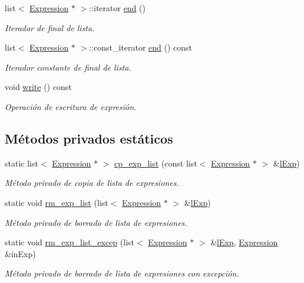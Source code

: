 \begin{DoxyCompactItemize}
list$<$ \hyperlink{class_expression}{Expression} $\ast$ $>$\+::iterator \hyperlink{class_expression_af5229aaf6bbb7200db55f220f315192e}{end} ()
\begin{DoxyCompactList}\small\item\em Iterador de final de lista. \end{DoxyCompactList}\item 
list$<$ \hyperlink{class_expression}{Expression} $\ast$ $>$\+::const\+\_\+iterator \hyperlink{class_expression_aa8be0d8b3dc53907a982c18e0c159b49}{end} () const 
\begin{DoxyCompactList}\small\item\em Iterador constante de final de lista. \end{DoxyCompactList}\item 
void \hyperlink{class_expression_a6d5d0fa496e3713c332c9f1edc269de5}{write} () const 
\begin{DoxyCompactList}\small\item\em Operación de escritura de expresión. \end{DoxyCompactList}\end{DoxyCompactItemize}
\subsection*{Métodos privados estáticos}
\begin{DoxyCompactItemize}
\item 
static list$<$ \hyperlink{class_expression}{Expression} $\ast$ $>$ \hyperlink{class_expression_a0d7df919d94bc861a5fe5be4be2dc836}{cp\+\_\+exp\+\_\+list} (const list$<$ \hyperlink{class_expression}{Expression} $\ast$ $>$ \&\hyperlink{class_expression_afb4f4617291f7e182cbf2252151b122a}{l\+Exp})
\begin{DoxyCompactList}\small\item\em Método privado de copia de lista de expresiones. \end{DoxyCompactList}\item 
static void \hyperlink{class_expression_ae80247fcce0b4d61f7b0227d5e176dce}{rm\+\_\+exp\+\_\+list} (list$<$ \hyperlink{class_expression}{Expression} $\ast$ $>$ \&\hyperlink{class_expression_afb4f4617291f7e182cbf2252151b122a}{l\+Exp})
\begin{DoxyCompactList}\small\item\em Método privado de borrado de lista de expresiones. \end{DoxyCompactList}\item 
static void \hyperlink{class_expression_af84a5a0c390b2cd9f481ed6e0a894d60}{rm\+\_\+exp\+\_\+list\+\_\+excep} (list$<$ \hyperlink{class_expression}{Expression} $\ast$ $>$ \&\hyperlink{class_expression_afb4f4617291f7e182cbf2252151b122a}{l\+Exp}, \hyperlink{class_expression}{Expression} \&in\+Exp)
\begin{DoxyCompactList}\small\item\em Método privado de borrado de lista de expresiones con excepción. \end{DoxyCompactList}\end{DoxyCompactItemize}
